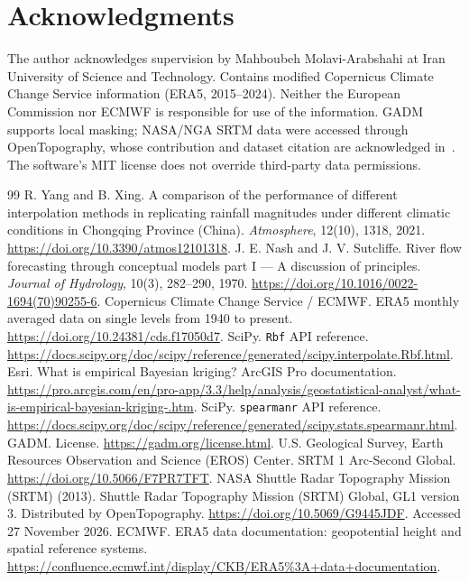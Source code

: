 \documentclass[11pt,a4paper]{article}
\begin{document}
\section*{Acknowledgments}
The author acknowledges supervision by Mahboubeh Molavi-Arabshahi at Iran University of Science and Technology. Contains modified Copernicus Climate Change Service information (ERA5, 2015--2024). Neither the European Commission nor ECMWF is responsible for use of the information. GADM supports local masking; NASA/NGA SRTM data were accessed through OpenTopography, whose contribution and dataset citation are acknowledged in~\cite{opentopo}. The software's MIT license does not override third-party data permissions.
\begingroup\small
\setlength{\parskip}{2pt}
\begin{thebibliography}{99}\setlength{\itemsep}{2pt}
 R. Yang and B. Xing. A comparison of the performance of different interpolation methods in replicating rainfall magnitudes under different climatic conditions in Chongqing Province (China). \textit{Atmosphere}, 12(10), 1318, 2021. \url{https://doi.org/10.3390/atmos12101318}.
 J. E. Nash and J. V. Sutcliffe. River flow forecasting through conceptual models part I --- A discussion of principles. \textit{Journal of Hydrology}, 10(3), 282--290, 1970. \url{https://doi.org/10.1016/0022-1694(70)90255-6}.
 Copernicus Climate Change Service / ECMWF. ERA5 monthly averaged data on single levels from 1940 to present. \url{https://doi.org/10.24381/cds.f17050d7}.
 SciPy. \texttt{Rbf} API reference. \url{https://docs.scipy.org/doc/scipy/reference/generated/scipy.interpolate.Rbf.html}.
 Esri. What is empirical Bayesian kriging? ArcGIS Pro documentation. \url{https://pro.arcgis.com/en/pro-app/3.3/help/analysis/geostatistical-analyst/what-is-empirical-bayesian-kriging-.htm}.
 SciPy. \texttt{spearmanr} API reference. \url{https://docs.scipy.org/doc/scipy/reference/generated/scipy.stats.spearmanr.html}.
 GADM. License. \url{https://gadm.org/license.html}.
 U.S. Geological Survey, Earth Resources Observation and Science (EROS) Center. SRTM 1 Arc-Second Global. \url{https://doi.org/10.5066/F7PR7TFT}.
 NASA Shuttle Radar Topography Mission (SRTM) (2013). Shuttle Radar Topography Mission (SRTM) Global, GL1 version 3. Distributed by OpenTopography. \url{https://doi.org/10.5069/G9445JDF}. Accessed 27 November 2026.
 ECMWF. ERA5 data documentation: geopotential height and spatial reference systems. \url{https://confluence.ecmwf.int/display/CKB/ERA5%3A+data+documentation}.
\end{thebibliography}
\endgroup
\clearpage
\appendix
\end{document}
